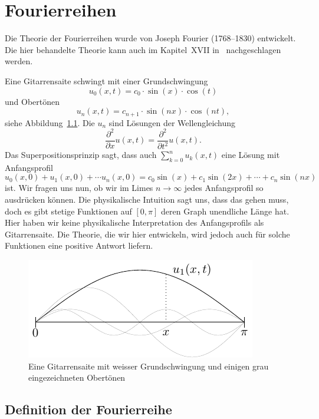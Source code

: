 \documentclass[../main.tex]{subfiles}
\begin{document}
\chapter{Fourierreihen}
Die Theorie der Fourierreihen wurde von Joseph Fourier
(1768--1830) entwickelt.
Die hier behandelte Theorie kann auch im Kapitel~XVII
in~\cite{heuser} nachgeschlagen werden.


\begin{motivation}
  Eine Gitarrensaite schwingt mit einer Grundschwingung
  \[
    u_0(x, t) = c_0 \cdot \sin(x) \cdot \cos(t)
  \]
  und Obertönen
  \[
    u_n(x, t) = c_{n+1} \cdot \sin(nx) \cdot \cos(nt),
  \]
  siehe Abbildung~\ref{fig:guitar}.
  Die $u_n$ sind Lösungen der Wellengleichung
  \[
    \frac{\partial^2}{\partial x} u(x, t)
    =
    \frac{\partial^2}{\partial t^2} u(x, t).
  \]
  Das Superpositionsprinzip sagt, dass auch
  $\sum_{k=0}^{n} u_k(x, t)$ eine Lösung
  mit Anfangsprofil 
  \[
    u_0(x, 0) + u_1(x, 0) + \cdots u_n(x, 0)
    = c_0 \sin(x) + c_1 \sin(2x) + \cdots + c_n \sin(nx)
  \]
  ist.
  Wir fragen uns nun, ob wir im Limes $n \to \infty$ 
  jedes Anfangsprofil so ausdrücken können.
  Die physikalische Intuition sagt uns, dass das gehen muss,
  doch es gibt stetige Funktionen auf $[0, \pi]$
  deren Graph unendliche Länge
  hat.
  Hier haben wir keine physikalische Interpretation des
  Anfangsprofils als Gitarrensaite. Die Theorie, die wir hier
  entwickeln, wird jedoch auch für solche Funktionen
  eine positive Antwort liefern.

\begin{figure}[htb]
  \centering
  \includegraphics{images/guitar}
  \caption{Eine Gitarrensaite mit weisser Grundschwingung
  und einigen grau eingezeichneten Obertönen}%
  \label{fig:guitar}
\end{figure}
\end{motivation}

\section{Definition der Fourierreihe}
\end{document}
